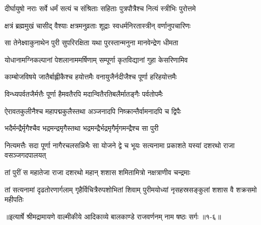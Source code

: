 \twolineshloka
{दीर्घायुषो नराः सर्वे धर्मं सत्यं च संश्रिताः}
{सहिताः पुत्रपौत्रैश्च नित्यं स्त्रीभिः पुरोत्तमे} %

\twolineshloka
{क्षत्रं ब्रह्ममुखं चासीद् वैश्याः क्षत्रमनुव्रताः}
{शूद्राः स्वधर्मनिरतास्त्रीन् वर्णानुपचारिणः} %

\twolineshloka
{सा तेनेक्ष्वाकुनाथेन पुरी सुपरिरक्षिता}
{यथा पुरस्तान्मनुना मानवेन्द्रेण धीमता} %

\twolineshloka
{योधानामग्निकल्पानां पेशलानाममर्षिणाम्}
{सम्पूर्णा कृतविद्यानां गुहा केसरिणामिव} %

\twolineshloka
{काम्बोजविषये जातैर्बाह्लीकैश्च हयोत्तमैः}
{वनायुजैर्नदीजैश्च पूर्णा हरिहयोत्तमैः} %

\twolineshloka
{विन्ध्यपर्वतजैर्मत्तैः पूर्णा हैमवतैरपि}
{मदान्वितैरतिबलैर्मातङ्गैः पर्वतोपमैः} %

\twolineshloka
{ऐरावतकुलीनैश्च महापद्मकुलैस्तथा}
{अञ्जनादपि निष्क्रान्तैर्वामनादपि च द्विपैः} %

\twolineshloka
{भदैर्मन्द्रैर्मृगैश्चैव भद्रमन्द्रमृगैस्तथा}
{भद्रमन्द्रैर्भद्रमृगैर्मृगमन्द्रैश्च सा पुरी} %

\threelineshloka
{नित्यमत्तैः सदा पूर्णा नागैरचलसन्निभैः}
{सा योजने द्वे च भूयः सत्यनामा प्रकाशते}
{यस्यां दशरथो राजा वसञ्जगदपालयत्} %

\twolineshloka
{तां पुरीं स महातेजा राजा दशरथो महान्}
{शशास शमितामित्रो नक्षत्राणीव चन्द्रमाः} %

\twolineshloka
{तां सत्यनामां दृढतोरणार्गलाम् गृहैर्विचित्रैरुपशोभितां शिवाम्}
{पुरीमयोध्यां नृसहस्रसङ्कुलां शशास वै शक्रसमो महीपतिः} %


॥इत्यार्षे श्रीमद्रामायणे वाल्मीकीये आदिकाव्ये बालकाण्डे राजवर्णनम् नाम षष्ठः सर्गः ॥१-६॥
